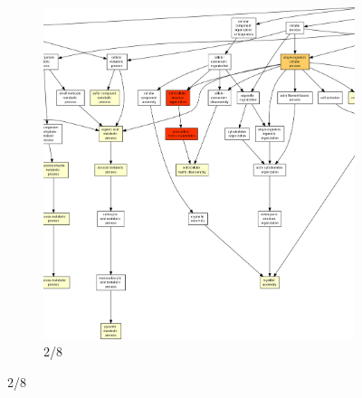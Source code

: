 \begin{figure}[p]
\ContinuedFloat
\begin{subfigure}{\textwidth}
\includegraphics[width=\textwidth]
{Figures/tfc-go-all-graph/tfc-go-all-graph_1.png}
\caption{2/8}
\end{subfigure}
\end{figure}

